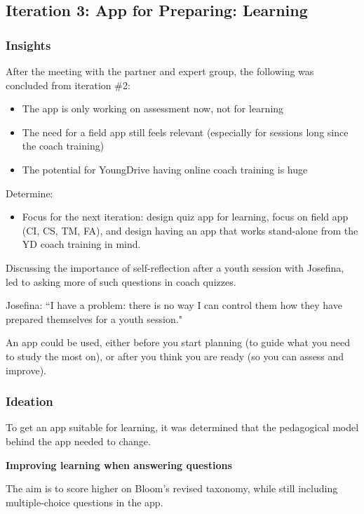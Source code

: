 \subsection{Iteration 3: App for Preparing: Learning}

\subsubsection{Insights}

After the meeting with the partner and expert group, the following was concluded from iteration \#2:

\begin{itemize}
\item The app is only working on assessment now, not for learning
\item The need for a field app still feels relevant (especially for sessions long since the coach training)
\item The potential for YoungDrive having online coach training is huge
\end{itemize}

Determine:
\begin{itemize}
  \item Focus for the next iteration: design quiz app for learning, focus on field app (CI, CS, TM, FA), and design having an app that works stand-alone from the YD coach training in mind.
\end{itemize}

Discussing the importance of self-reflection after a youth session with Josefina, led to asking more of such questions in coach quizzes.

Josefina: “I have a problem: there is no way I can control them how they have prepared themselves for a youth session."

An app could be used, either before you start planning (to guide what you need to study the most on), or after you think you are ready (so you can assess and improve).

\subsubsection{Ideation}

To get an app suitable for learning, it was determined that the pedagogical model behind the app needed to change.

\textbf{Improving learning when answering questions}

The aim is to score higher on Bloom's revised taxonomy, while still including multiple-choice questions in the app.

